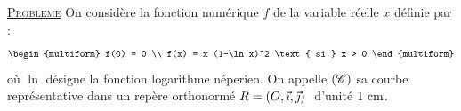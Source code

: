 \noindent \underline{\textsc{Probleme}} \newline
      On consid\`ere la fonction num\'erique $f$ de la variable r\'eelle $x$ d\'efinie par : 
            \[
                  \begin{multiform}
                        f(0) = 0 \\
                        f(x) = x (1-\ln x)^2 \text{ si } x > 0 
                  \end{multiform}
            \]
            o\`u $\ln$ d\'esigne la fonction logarithme n\'eperien.
      On appelle $(\mathscr{C})$ sa courbe repr\'esentative dans un rep\`ere orthonorm\'e $R = \text{$(O,\vec{\imath},\vec{\jmath})$ }$ d'unit\'e $1~\mathrm{cm}$.
